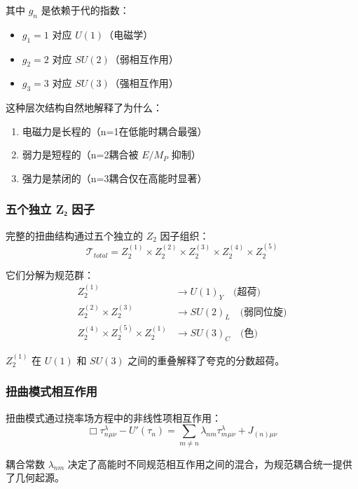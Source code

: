 其中 $g_n$ 是依赖于代的指数：
\begin{itemize}
    \item $g_1 = 1$ 对应 $U(1)$（电磁学）
    \item $g_2 = 2$ 对应 $SU(2)$（弱相互作用）
    \item $g_3 = 3$ 对应 $SU(3)$（强相互作用）
\end{itemize}

这种层次结构自然地解释了为什么：
\begin{enumerate}
    \item 电磁力是长程的（n=1在低能时耦合最强）
    \item 弱力是短程的（n=2耦合被 $E/M_P$ 抑制）
    \item 强力是禁闭的（n=3耦合仅在高能时显著）
\end{enumerate}

\subsubsection{五个独立 Z₂ 因子}

完整的扭曲结构通过五个独立的 $Z_2$ 因子组织：
\begin{equation}
    \mathcal{T}_{total} = Z_2^{(1)} \times Z_2^{(2)} \times Z_2^{(3)} \times Z_2^{(4)} \times Z_2^{(5)}
\end{equation}

它们分解为规范群：
\begin{align}
    Z_2^{(1)} &\to U(1)_Y \quad \text{(超荷)} \\
    Z_2^{(2)} \times Z_2^{(3)} &\to SU(2)_L \quad \text{(弱同位旋)} \\
    Z_2^{(4)} \times Z_2^{(5)} \times Z_2^{(1)} &\to SU(3)_C \quad \text{(色)}
\end{align}

$Z_2^{(1)}$ 在 $U(1)$ 和 $SU(3)$ 之间的重叠解释了夸克的分数超荷。

\subsubsection{扭曲模式相互作用}

扭曲模式通过挠率场方程中的非线性项相互作用：
\begin{equation}
    \Box \tau_n^{\lambda}{}_{\mu\nu} - U'(\tau_n) = \sum_{m \neq n} \lambda_{nm} \tau_m^{\lambda}{}_{\mu\nu} + J_{(n)\mu\nu}
\end{equation}

耦合常数 $\lambda_{nm}$ 决定了高能时不同规范相互作用之间的混合，为规范耦合统一提供了几何起源。

